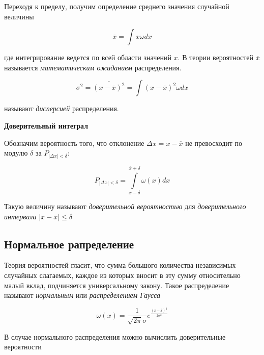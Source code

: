 \documentclass[12pt]{article}
\begin{document}
        Переходя к пределу, получим определение среднего значения случайной величины

        \begin{equation}
          \overline{x} = \int x \omega dx
        \end{equation}

        где интегрирование ведется по всей области значений $x$. В теории вероятностей
        $\overline{x}$ называется \textit{математическим ожиданием} распределения.

        \begin{equation}
          \sigma^2 = \overline{(x - \overline{x})^2} = \int (x - \overline{x})^2 \omega dx
        \end{equation}

        называют \textit{дисперсией} распределения.

      \vspace{1cm}

      \textbf{Доверительный интеграл}

        Обозначим вероятность того, что отклонение $\Delta x = x - \overline{x}$
        не превосходит по модулю $\delta$ за $P_{|\Delta x| < \delta}$:

        \begin{equation}
          P_{|\Delta x| < \delta} = \int \limits_{\overline{x} - \delta}^{\overline{x} + \delta}
          \omega (x) dx
        \end{equation}

        Такую величину называют \textit{доверительной вероятностью} для
        \textit{доверительного интервала} $|x - \overline{x}| \leqslant \delta$

    \subsection{Нормальное рапределение}

      Теория вероятностей гласит, что сумма большого количества независимых случайных
      слагаемых, каждое из которых вносит в эту сумму относительно малый вклад,
      подчиняется универсальному закону. Такое распределение называют
      \textit{нормальным} или \textit{распределением Гаусса}

      \begin{equation}
        \omega (x) = \frac{1}{\sqrt{2 \pi} \sigma} e^{\frac{(x - \overline{x})^2}{2 \sigma^2}}
      \end{equation}

      В случае нормального распределения можно вычислить доверительные вероятности
\end{document}
